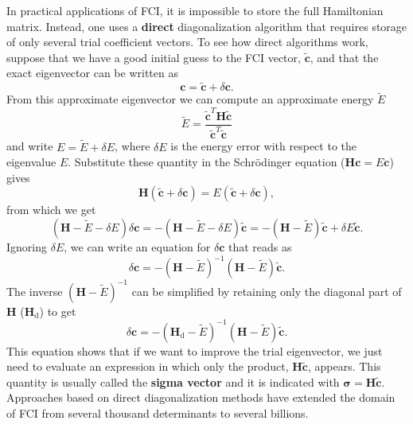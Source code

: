 \documentclass[../Main/chem532-notes.tex]{subfiles}
\begin{document}
In practical applications of FCI, it is impossible to store the full Hamiltonian matrix.
Instead, one uses a \textbf{direct} diagonalization algorithm that requires storage of only several trial coefficient vectors.
To see how direct algorithms work, suppose that we have a good initial guess to the FCI vector, $\tilde{\mathbf{c}}$, and that the exact eigenvector can be written as
\begin{equation}
\mathbf{c} = \tilde{\mathbf{c}} + \delta \mathbf{c}.
\end{equation}
From this approximate eigenvector we can compute an approximate energy $\tilde{E}$
\begin{equation}
\tilde{E} = \frac{\tilde{\mathbf{c}}^T
 \mathbf{H}\tilde{\mathbf{c}}}{\tilde{\mathbf{c}}^T \tilde{\mathbf{c}}}
\end{equation}
and write $E = \tilde{E} + \delta E$, where $\delta E$ is the energy error with respect to the eigenvalue $E$.
Substitute these quantity in the Schr\"{o}dinger equation ($\mathbf{Hc} = E\mathbf{c}$) gives
\begin{equation}
\mathbf{H}(\tilde{\mathbf{c}} + \delta \mathbf{c}) = E (\tilde{\mathbf{c}} + \delta \mathbf{c}),
\end{equation}
from which we get
\begin{equation}
(\mathbf{H} - \tilde{E} - \delta E)\delta \mathbf{c} =-
(\mathbf{H} - \tilde{E} - \delta E) \tilde{\mathbf{c}}
= -(\mathbf{H} - \tilde{E}) \tilde{\mathbf{c}} + \delta E \tilde{\mathbf{c}}.
\end{equation}
Ignoring $\delta E$, we can write an equation for $\delta \mathbf{c}$ that reads as
\begin{equation}
\delta \mathbf{c} = -(\mathbf{H} - \tilde{E})^{-1}(\mathbf{H} - \tilde{E}) \tilde{\mathbf{c}}.
\end{equation}
The inverse $(\mathbf{H} - \tilde{E})^{-1}$ can be simplified by retaining only the diagonal part of $\mathbf{H}$ ($\mathbf{H}_\mathrm{d}$) to get
\begin{equation}
\delta \mathbf{c} = -(\mathbf{H}_\mathrm{d} - \tilde{E})^{-1}(\mathbf{H} - \tilde{E}) \tilde{\mathbf{c}}.
\end{equation}
This equation shows that if we want to improve the trial eigenvector, we just need to evaluate an expression in which only the product, $\mathbf{H}\tilde{\mathbf{c}}$, appears. This quantity is usually called the \textbf{sigma vector} and it is indicated with $\boldsymbol{\sigma} = \mathbf{H}\tilde{\mathbf{c}}$.
Approaches based on direct diagonalization methods have extended the domain of FCI from several thousand determinants to several billions.
\end{document}
